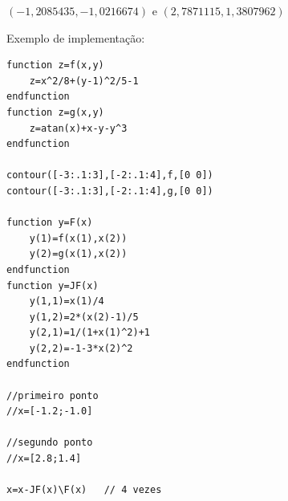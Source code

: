 \begin{resp}
$\left(-1,2085435, -1,0216674 \right)$ e $\left(2,7871115, 1,3807962\right)$

\ifisscilab
Exemplo de implementação:
\begin{verbatim}
function z=f(x,y)
    z=x^2/8+(y-1)^2/5-1
endfunction
function z=g(x,y)
    z=atan(x)+x-y-y^3
endfunction

contour([-3:.1:3],[-2:.1:4],f,[0 0])
contour([-3:.1:3],[-2:.1:4],g,[0 0])

function y=F(x)
    y(1)=f(x(1),x(2))
    y(2)=g(x(1),x(2))
endfunction
function y=JF(x)
    y(1,1)=x(1)/4
    y(1,2)=2*(x(2)-1)/5
    y(2,1)=1/(1+x(1)^2)+1
    y(2,2)=-1-3*x(2)^2
endfunction

//primeiro ponto
//x=[-1.2;-1.0]

//segundo ponto
//x=[2.8;1.4]

x=x-JF(x)\F(x)   // 4 vezes
\end{verbatim}
\fi
\end{resp}




